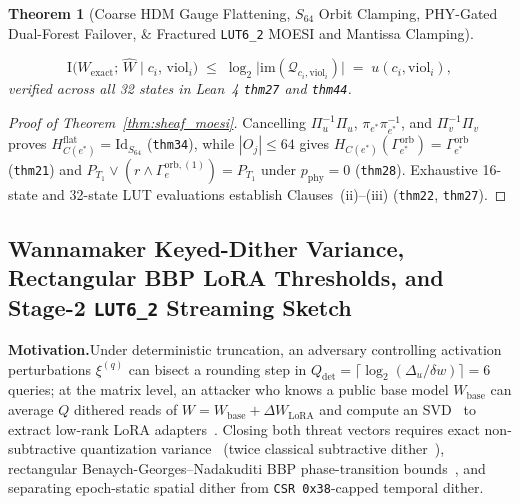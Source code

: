 \documentclass[11pt,letterpaper]{article}
\theoremstyle{spectralthm}
\newtheorem{theorem}{Theorem}[section]
\begin{document}
\begin{theorem}[Coarse HDM Gauge Flattening, $S_{64}$ Orbit Clamping, PHY-Gated Dual-Forest Failover, \& Fractured \texttt{LUT6\_2} MOESI and Mantissa Clamping]
\begin{enumerate}
  \begin{equation}
  \label{eq:shannon_mantissa}
  \mathrm{I}\bigl(W_{\mathrm{exact}};\,\hat{W} \;\big|\; c_i,\,\mathrm{viol}_i\bigr) \;\le\; \log_2\bigl|\mathrm{im}(\mathcal{Q}_{c_i,\mathrm{viol}_i})\bigr| \;=\; u(c_i, \mathrm{viol}_i),
  \end{equation}
  verified across all 32 states in Lean~4 \texttt{thm27} and \texttt{thm44}.
\end{enumerate}
\end{theorem}
\begin{proof}[Proof of Theorem~\ref{thm:sheaf_moesi}]
Cancelling $\Pi_u^{-1}\Pi_u$, $\pi_{e^*}\pi_{e^*}^{-1}$, and $\Pi_v^{-1}\Pi_v$ proves $H_{C(e^*)}^{\mathrm{flat}} = \mathrm{Id}_{S_{64}}$ (\texttt{thm34}), while $|O_j| \le 64$ gives $H_{C(e^*)}(\Gamma_{e^*}^{\mathrm{orb}}) = \Gamma_{e^*}^{\mathrm{orb}}$ (\texttt{thm21}) and $P_{T_1} \vee (r \wedge \Gamma_e^{\mathrm{orb},(1)}) = P_{T_1}$ under $p_{\mathrm{phy}}=0$ (\texttt{thm28}). Exhaustive 16-state and 32-state LUT evaluations establish Clauses~(ii)--(iii) (\texttt{thm22}, \texttt{thm27}).
\end{proof}

\subsection{Wannamaker Keyed-Dither Variance, Rectangular BBP LoRA Thresholds, and Stage-2 \texorpdfstring{\texttt{LUT6\_2}}{LUT6\_2} Streaming Sketch}
\label{sec:dither_bbp_sketch}
\noindent\textbf{Motivation.}\;Under deterministic truncation, an adversary controlling activation perturbations $\xi^{(q)}$ can bisect a rounding step in $Q_{\mathrm{det}} = \lceil\log_2(\Delta_u/\delta w)\rceil = 6$ queries; at the matrix level, an attacker who knows a public base model $W_{\mathrm{base}}$ can average $Q$ dithered reads of $W = W_{\mathrm{base}} + \Delta W_{\mathrm{LoRA}}$ and compute an SVD~\cite{carlini2024stealing} to extract low-rank LoRA adapters~\cite{hu2022lora}. Closing both threat vectors requires exact non-subtractive quantization variance~\cite{wannamaker2000nonsubtractive} (twice classical subtractive dither~\cite{schuchman1964dither, gray1993dithered}), rectangular Benaych-Georges--Nadakuditi BBP phase-transition bounds~\cite{benaych2012singular}, and separating epoch-static spatial dither from \texttt{CSR 0x38}-capped temporal dither.\par\smallskip
\end{document}
